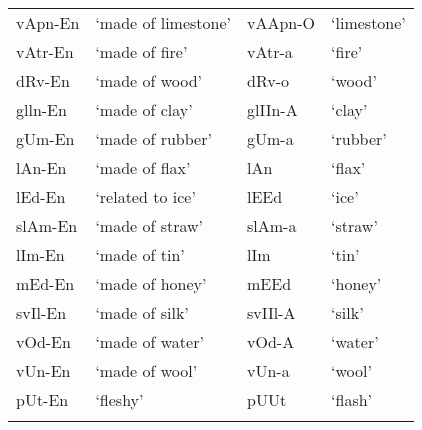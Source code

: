 \documentclass[output=paper]{langsci/langscibook}
\begin{document}
\begin{table}
\begin{tabular}{ l l l l}
\\  vApn-En & `made of limestone' & vAApn-O & `limestone' 
\\  vAtr-En & `made of fire' & vAtr-a & `fire' 
\\  dRv-En & `made of wood' & dRv-o & `wood'
\\  glln-En & `made of clay' & glIIn-A & `clay' 
\\  gUm-En & `made of rubber' & gUm-a & `rubber' 
\\  lAn-En & `made of flax' & lAn & `flax' 
\\  lEd-En & `related to ice' & lEEd & `ice' 
\\  slAm-En & `made of straw' & slAm-a & `straw' 
\\  lIm-En & `made of tin' & lIm & `tin' 
\\  mEd-En & `made of honey' & mEEd & `honey' 
\\  svIl-En & `made of silk' & svIIl-A & `silk' 
\\  vOd-En & `made of water' & vOd-A & `water' 
\\  vUn-En & `made of wool' & vUn-a & `wool' 
\\  pUt-En & `fleshy' & pUUt & `flash' 
\\ 
 \lspbottomrule
 \end{tabular}
\end{table} 
\end{document}
